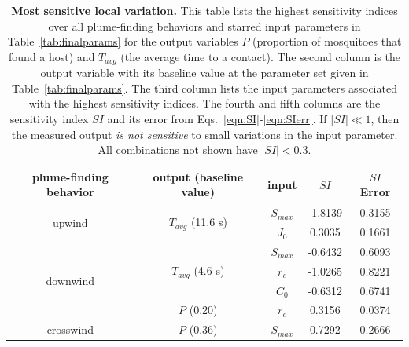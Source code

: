 \documentclass[10pt]{article}
\begin{document}
\begin{table}[!htp]
\caption{
{\bf Most sensitive local variation.} This table lists the highest sensitivity indices over all plume-finding behaviors and starred input parameters in Table~\ref{tab:finalparams} for the output variables $P$ (proportion of mosquitoes that found a host) and $T_{avg}$ (the average time to a contact). The second column is the output variable with its baseline value at the parameter set given in Table~\ref{tab:finalparams}. The third column lists the input parameters associated with the highest sensitivity indices. The fourth and fifth columns are the sensitivity index $SI$ and its error from Eqs.~\eqref{eqn:SI}-\eqref{eqn:SIerr}. If $|SI| \ll 1$, then the measured output \textit{is not sensitive} to small variations in the input parameter. All combinations not shown have $|SI| < 0.3$. }
	\begin{center}
		\begin{tabular}{|c|c|c|c|c|}
			\hline
			plume-finding behavior & output (baseline value) & input & $SI$ & $SI$ Error \\
			\hline
			\multirow{2}{*}{upwind} & \multirow{2}{*}{$T_{avg}$ (11.6 s)} & $S_{max}$  &  -1.8139 & 0.3155 \\
										& 						  & 	$J_0$&    0.3035 & 0.1661 \\
			\hline
			\multirow{5}{*}{downwind} & \multirow{3}{*}{$T_{avg}$ (4.6 s)} & $S_{max}$  & -0.6432 & 0.6093\\
										&								& $r_c$		&  -1.0265 & 0.8221\\						
										& 						  & 	$C_0$		&   -0.6312 & 0.6741\\
										\cline{2-5}
										 & \multirow{2}{*}{$P$ (0.20)}	& \multirow{2}{*}{$r_c$}  & \multirow{2}{*}{0.3156} & \multirow{2}{*}{0.0374}\\
										&&&&\\
			\hline
				\multirow{2}{*}{crosswind} & \multirow{2}{*}{$P$ (0.36)}	& \multirow{2}{*}{$S_{max}$} & \multirow{2}{*}{0.7292}  & \multirow{2}{*}{0.2666}\\
			&&&&\\
			\hline
		\end{tabular}
	\end{center}\label{tab:sensitivity}
\end{table}
\end{document}
